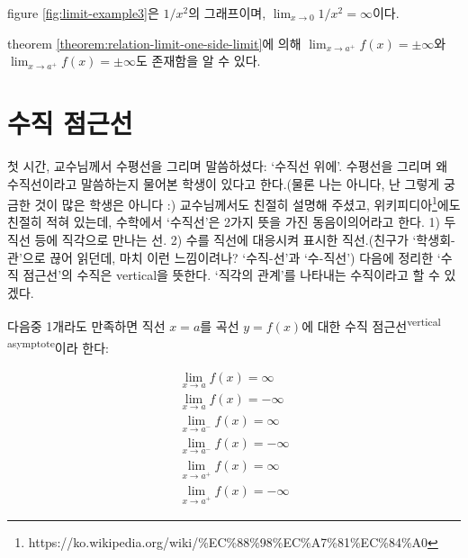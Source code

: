 \documentclass[../note.tex]{subfiles}
\begin{document}
\begin{example}
  figure \ref{fig:limit-example3}은 $1/x^2$의 그래프이며, $\lim_{x \to 0} 1/x^2 = \infty$이다.

  \begin{center}
  \end{center}
\end{example}
theorem \ref{theorem:relation-limit-one-side-limit}에 의해 $\lim_{x \to a^{+}} f(x) = \pm\infty$와 $\lim_{x \to a^{+}} f(x) = \pm\infty$도 존재함을 알 수 있다.

\section{수직 점근선}
첫 시간, 교수님께서 수평선을 그리며 말씀하셨다: `수직선 위에'. 수평선을 그리며 왜 수직선이라고 말씀하는지 물어본 학생이 있다고 한다.(물론 나는 아니다, 난 그렇게 궁금한 것이 많은 학생은 아니다 :) 교수님께서도 친절히 설명해 주셨고, 위키피디아\footnote{https://ko.wikipedia.org/wiki/\%EC\%88\%98\%EC\%A7\%81\%EC\%84\%A0}에도 친절히 적혀 있는데, 수학에서 `수직선'은 2가지 뜻을 가진 동음이의어라고 한다. 1) 두 직선 등에 직각으로 만나는 선. 2) 수를 직선에 대응시켜 표시한 직선.(친구가 `학생회-관'으로 끊어 읽던데, 마치 이런 느낌이려나? `수직-선'과 `수-직선') 다음에 정리한 `수직 점근선'의 수직은 vertical을 뜻한다. `직각의 관계'를 나타내는 수직이라고 할 수 있겠다.
\begin{definition}[수직 점근선]
  다음중 1개라도 만족하면 직선 $x = a$를 곡선 $y=f(x)$에 대한 수직 점근선\textsuperscript{vertical asymptote}이라 한다:
  \begin{multicol}[2]
  \begin{align}
    \lim_{x \to a} f(x) = \infty \\
    \lim_{x \to a} f(x) = -\infty \\
    \lim_{x \to a^{-}} f(x) = \infty \\
    \lim_{x \to a^{-}} f(x) = -\infty \\
    \lim_{x \to a^{+}} f(x) = \infty \\
    \lim_{x \to a^{+}} f(x) = -\infty
  \end{align}
  \end{multicol}
\end{definition}
\end{document}
